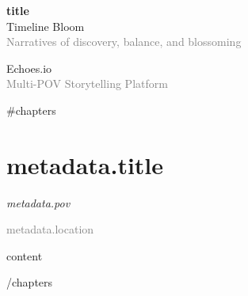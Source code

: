 \documentclass[12pt,a5paper]{book}
\newcommand{\echochapter}[4]{
  \chapter{#1}
  \begin{flushright}
    \textit{\textcolor{bloomdark}{#2}} %
  \end{flushright}
  \vspace{0.5em}
  \textcolor{gray}{\small #3} %
  \vspace{1em}
  
  #4 %
}
\newcommand{\timelinetitle}[1]{
  \begin{center}
    {\Huge\textcolor{bloomterracotta}{\textbf{#1}}}\\
    \vspace{0.5em}
    {\large\textcolor{bloomdark}{Timeline Bloom}}\\
    \vspace{0.2em}
    {\small\textcolor{gray}{Narratives of discovery, balance, and blossoming}}
  \end{center}
}
\begin{document}
\thispagestyle{empty}
\vspace*{2cm}
\timelinetitle{{{title}}}
\vfill
\begin{center}
  \textcolor{bloomdark}{Echoes.io}\\
  \textcolor{gray}{\small Multi-POV Storytelling Platform}
\end{center}
\newpage

\tableofcontents
\newpage

{{#chapters}}
\echochapter{{{metadata.title}}}{{{metadata.pov}}}{{{metadata.location}}}{
{{content}}
}
\newpage
{{/chapters}}
\end{document}
